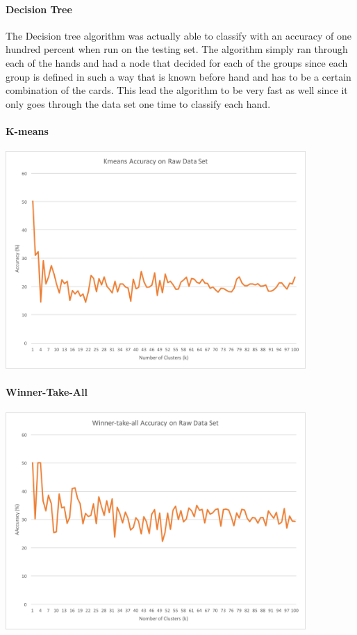\documentclass{article}
\begin{document}
\paragraph{Decision Tree}
The Decision tree algorithm was actually able to classify with an accuracy of one hundred percent when run on the testing set. The algorithm simply ran through each of the hands and had a node that decided for each of the groups since each group is defined in such a way that is known before hand and has to be a certain combination of the cards. This lead the algorithm to be very fast as well since it only goes through the data set one time to classify each hand.

\paragraph{K-means}
\centerline{\includegraphics[width = 4.5in]{images/KmeansAccuracyRaw}}

\paragraph{Winner-Take-All}
\centerline{\includegraphics[width = 4.5in]{images/WtaAccuracyRaw}}
\end{document}

